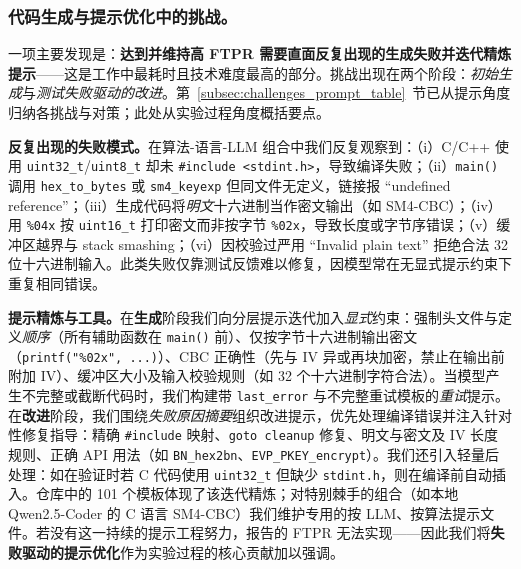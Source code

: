 \documentclass[12pt]{llncs}
\begin{document}
\subsubsection{代码生成与提示优化中的挑战。}
\label{subsec:challenges_prompt}
一项主要发现是：\textbf{达到并维持高 FTPR 需要直面反复出现的生成失败并迭代精炼提示}——这是工作中最耗时且技术难度最高的部分。挑战出现在两个阶段：\emph{初始生成}与\emph{测试失败驱动的改进}。第~\ref{subsec:challenges_prompt_table}~节已从提示角度归纳各挑战与对策；此处从实验过程角度概括要点。

\textbf{反复出现的失败模式。}在算法-语言-LLM 组合中我们反复观察到：（i）C/C++ 使用 \texttt{uint32\_t}/\texttt{uint8\_t} 却未 \texttt{\#include <stdint.h>}，导致编译失败；（ii）\texttt{main()} 调用 \texttt{hex\_to\_bytes} 或 \texttt{sm4\_keyexp} 但同文件无定义，链接报 ``undefined reference''；（iii）生成代码将\emph{明文}十六进制当作密文输出（如 SM4-CBC）；（iv）用 \texttt{\%04x} 按 \texttt{uint16\_t} 打印密文而非按字节 \texttt{\%02x}，导致长度或字节序错误；（v）缓冲区越界与 stack smashing；（vi）因校验过严用 ``Invalid plain text'' 拒绝合法 32 位十六进制输入。此类失败仅靠测试反馈难以修复，因模型常在无显式提示约束下重复相同错误。

\textbf{提示精炼与工具。}在\textbf{生成}阶段我们向分层提示迭代加入\emph{显式}约束：强制头文件与定义\emph{顺序}（所有辅助函数在 \texttt{main()} 前）、仅按字节十六进制输出密文（\texttt{printf("\%02x", ...)}）、CBC 正确性（先与 IV 异或再块加密，禁止在输出前附加 IV）、缓冲区大小及输入校验规则（如 32 个十六进制字符合法）。当模型产生不完整或截断代码时，我们构建带 \texttt{last\_error} 与不完整重试模板的\emph{重试}提示。在\textbf{改进}阶段，我们围绕\emph{失败原因摘要}组织改进提示，优先处理编译错误并注入针对性修复指导：精确 \texttt{\#include} 映射、\texttt{goto cleanup} 修复、明文与密文及 IV 长度规则、正确 API 用法（如 \texttt{BN\_hex2bn}、\texttt{EVP\_PKEY\_encrypt}）。我们还引入轻量后处理：如在验证时若 C 代码使用 \texttt{uint32\_t} 但缺少 \texttt{stdint.h}，则在编译前自动插入。仓库中的 101 个模板体现了该迭代精炼；对特别棘手的组合（如本地 Qwen2.5-Coder 的 C 语言 SM4-CBC）我们维护专用的按 LLM、按算法提示文件。若没有这一持续的提示工程努力，报告的 FTPR 无法实现——因此我们将\textbf{失败驱动的提示优化}作为实验过程的核心贡献加以强调。
\end{document}
